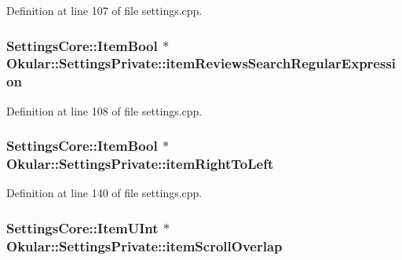 Definition at line 107 of file settings.\+cpp.

\hypertarget{classOkular_1_1SettingsPrivate_ae5a97eef0f44ac55fbf6366c6b9e0e0e}{
\subsubsection[{item\+Reviews\+Search\+Regular\+Expression}]{\setlength{\rightskip}{0pt plus 5cm}Settings\+Core\+::\+Item\+Bool $\ast$ Okular\+::\+Settings\+Private\+::item\+Reviews\+Search\+Regular\+Expression}}\label{classOkular_1_1SettingsPrivate_ae5a97eef0f44ac55fbf6366c6b9e0e0e}


Definition at line 108 of file settings.\+cpp.

\hypertarget{classOkular_1_1SettingsPrivate_ae1b0d4803230e42e6ff4a4266181bd3f}{
\subsubsection[{item\+Right\+To\+Left}]{\setlength{\rightskip}{0pt plus 5cm}Settings\+Core\+::\+Item\+Bool $\ast$ Okular\+::\+Settings\+Private\+::item\+Right\+To\+Left}}\label{classOkular_1_1SettingsPrivate_ae1b0d4803230e42e6ff4a4266181bd3f}


Definition at line 140 of file settings.\+cpp.

\hypertarget{classOkular_1_1SettingsPrivate_a94f89e7be20cbb40594e9a029f6e5951}{
\subsubsection[{item\+Scroll\+Overlap}]{\setlength{\rightskip}{0pt plus 5cm}Settings\+Core\+::\+Item\+U\+Int $\ast$ Okular\+::\+Settings\+Private\+::item\+Scroll\+Overlap}}\label{classOkular_1_1SettingsPrivate_a94f89e7be20cbb40594e9a029f6e5951}


